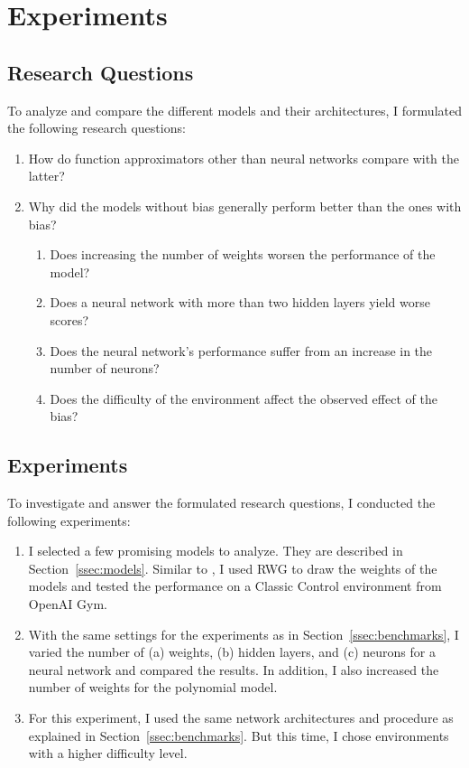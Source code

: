 
\chapter{Experiments}
\label{ch:experiments}

\section{Research Questions}
To analyze and compare the different models and their architectures, I formulated the following research questions:
\begin{enumerate}
  \item How do function approximators other than neural networks compare with the latter?
  \item Why did the models without bias generally perform better than the ones with bias?
  \begin{enumerate}
    \item Does increasing the number of weights worsen the performance of the model?
    \item Does a neural network with more than two hidden layers yield worse scores?
    \item Does the neural network's performance suffer from an increase in the number of neurons?
    \item Does the difficulty of the environment affect the observed effect of the bias?
  \end{enumerate}
\end{enumerate}

\section{Experiments}
To investigate and answer the formulated research questions, I conducted the following experiments:
\begin{enumerate}
  \item I selected a few promising models to analyze. They are described in Section~\ref{ssec:models}. Similar to \citet{oller_analyzing_2020}, I used RWG to draw the weights of the models and tested the performance on a Classic Control environment from OpenAI Gym.
  \item With the same settings for the experiments as in Section~\ref{ssec:benchmarks}, I varied the number of (a) weights, (b) hidden layers, and (c) neurons for a neural network and compared the results. In addition, I also increased the number of weights for the polynomial model.
  \item For this experiment, I used the same network architectures and procedure as explained in Section~\ref{ssec:benchmarks}. But this time, I chose environments with a higher difficulty level.
\end{enumerate}


